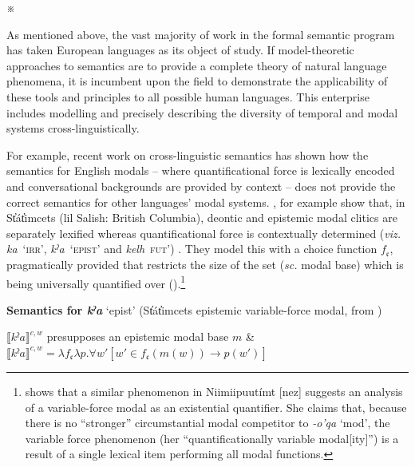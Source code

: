 \documentclass[11pt,dvipsnames]{report}
\providecommand{\denote}[2][]{\ensuremath{\llbracket{#2}\rrbracket^{#1}}}
\newcommand{\fancybreak}{\begin{center}
		\huge\sf	 ※ %
\end{center}

\noindent}
\begin{document}
\xe


\fancybreak 
As mentioned above, the vast majority of work in the formal semantic program has taken European languages as its object of study. If model-theoretic approaches to semantics are to provide a complete theory of natural language phenomena, it is incumbent upon the field to demonstrate the applicability of these tools and principles to all possible human languages. This enterprise includes modelling and precisely describing the diversity of temporal and modal systems cross-linguistically.

For example, recent work on cross-linguistic semantics has shown how the semantics for English modals -- where quantificational force is lexically encoded and conversational backgrounds are provided by context -- does not provide the correct semantics for other languages' modal systems. \citet{Rullmann2008}, for example show that, in St̓át̓imcets (\gls{lil} Salish: British Columbia), deontic and epistemic modal clitics are separately lexified whereas quantificational force is contextually determined (\textit{viz.} \textit{ka}~`\textsc{irr}', \textit{kˀa}~`\textsc{epist}' and \textit{kelh}~\textsc{fut}') \citep[see also][]{Peterson2010,Matthewson2010}. They model this with a choice function $ f_{\mathfrak c}$, pragmatically provided that restricts the size of the set (\textit{sc.} modal base) which is being universally quantified over (\nextx).\footnote{\citet{Deal2011} shows that a similar phenomenon in Niimiipuutímt [\gls{nez}] suggests an analysis of a variable-force modal as an existential quantifier. She claims that, because there is no ``stronger'' circumstantial modal competitor to \textit{-o'qa} `\gls{mod}', the variable force phenomenon (her ``quantificationally variable modal[ity]'') is a result of a single lexical item performing all modal functions.}

\pex \textbf{Semantics for \textit{kˀa} }`\gls{epist}' (St̓át̓imcets epistemic variable-force modal, from \citealp[340]{Rullmann2008})

\denote[c,w]{\textit{kˀa}} presupposes an epistemic modal base $ m $ \&\\
$ \denote[c,w]{\textit{kˀa}}=\lambda f_{\mathfrak c}\lambda p.\forall w'[w'\in f_{\mathfrak c}(m(w))\to p(w')]$
\xe
\end{document}
